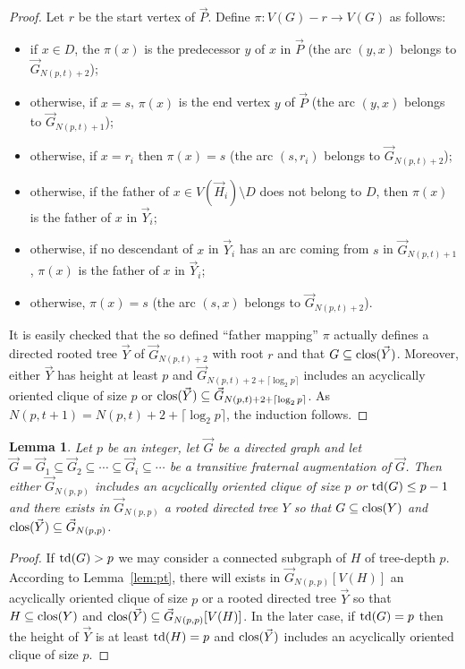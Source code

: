 \documentclass[a4paper]{amsart}
\newtheorem{lemma}[theorem]{Lemma}
\theoremstyle{definition}
\theoremstyle{remark}
\DeclareMathOperator\depth{{\rm td}}
\DeclareMathOperator\clos{{\rm clos}}
\def\vG{\vec{G}}
\def\vH{\vec{H}}
\def\vP{\vec{P}}
\def\vY{\vec{Y}}
\begin{document}
\begin{proof}
Let $r$ be the start vertex of $\vP$.
Define $\pi: V(G)-r\rightarrow V(G)$ as follows:
\begin{itemize}
\item if $x\in D$, the $\pi(x)$ is the predecessor $y$ of
  $x$ in $\vP$ (the arc $(y,x)$ belongs to $\vG_{N(p,t)+2}$);
\item otherwise, if $x=s$, $\pi(x)$ is the end vertex $y$ of
  $\vP$ (the arc $(y,x)$ belongs to $\vG_{N(p,t)+1}$);
\item otherwise, if $x=r_i$ then  $\pi(x)=s$
(the arc $(s,r_i)$ belongs to $\vG_{N(p,t)+2}$);
\item otherwise, if the father of $x\in V(\vH_i)\setminus D$ does not
  belong to $D$, then $\pi(x)$ is the father of $x$
  in $\vY_i$;
\item otherwise, if no descendant of $x$ in $\vY_i$ has an arc coming
  from $s$ in $\vG_{N(p,t)+1}$, $\pi(x)$ is the
  father of $x$ in $\vY_i$;
\item otherwise, $\pi(x)=s$ (the arc $(s,x)$
  belongs to $\vG_{N(p,t)+2}$).
\end{itemize}
It is easily checked that the so defined ``father mapping'' $\pi$ actually
defines a directed rooted tree $\vY$ of  $\vG_{N(p,t)+2}$ with root
$r$ and that $G\subseteq\clos(\vY)$. Moreover, either $\vY$ has height
at least $p$ and  $\vG_{N(p,t)+2+\lceil\log_2 p\rceil}$ includes an acyclically
oriented clique of size $p$ or $\clos(\vY)\subseteq
\vG_{N(p,t)+2+\lceil\log_2 p\rceil}$.
As $N(p,t+1)=N(p,t)+2+\lceil\log_2 p\rceil$, the induction follows.
\end{proof}
\begin{lemma}
\label{lem:p}
Let $p$ be an integer, let $\vG$ be a directed graph and let
$\vG=\vG_1\subseteq\vG_2\subseteq\dotsb\subseteq \vG_i\subseteq\dotsb$
be a transitive fraternal augmentation of $\vG$.
Then either $\vG_{N(p,p)}$ includes an acyclically oriented clique of
size $p$ or $\depth(G)\leq p-1$ and there
exists in $\vG_{N(p,p)}$ a rooted directed tree $Y$ so that
$G\subseteq\clos(Y)$ and $\clos(\vY)\subseteq \vG_{N(p,p)}$.
\end{lemma}
\begin{proof}
If $\depth(G)>p$ we may consider a connected subgraph of $H$ of tree-depth
$p$. According to Lemma~\ref{lem:pt}, there will exists in
$\vG_{N(p,p)}[V(H)]$ an acyclically
oriented clique of size $p$ or a rooted directed tree $\vY$ so that
$H\subseteq\clos(Y)$ and $\clos(\vY)\subseteq \vG_{N(p,p)}[V(H)]$. In
the later case, if $\depth(G)=p$ then the height of $\vY$ is at least
$\depth(H)=p$ and $\clos(\vY)$ includes an acyclically oriented clique
of size $p$.
\end{proof}
\end{document}
